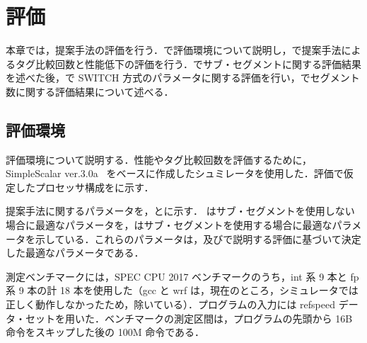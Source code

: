 
\chapter{評価}
\label{sec:eval}
本章では，提案手法の評価を行う．で評価環境について説明し，で提案手法によるタグ比較回数と性能低下の評価を行う．でサブ・セグメントに関する評価結果を述べた後，で SWITCH 方式のパラメータに関する評価を行い，でセグメント数に関する評価結果について述べる．

\section{評価環境}
\label{sec:eval_env}
評価環境について説明する．性能やタグ比較回数を評価するために，SimpleScalar ver.3.0a~\cite{SimpleScalar} をベースに作成したシュミレータを使用した．評価で仮定したプロセッサ構成をに示す．

提案手法に関するパラメータを，とに示す． はサブ・セグメントを使用しない場合に最適なパラメータを，はサブ・セグメントを使用する場合に最適なパラメータを示している．これらのパラメータは，及びで説明する評価に基づいて決定した最適なパラメータである．

測定ベンチマークには，SPEC CPU 2017 ベンチマークのうち，int 系 9 本と fp 系 9 本の計 18 本を使用した（gcc と wrf は，現在のところ，シミュレータでは正しく動作しなかったため，除いている）．プログラムの入力には refspeed データ・セットを用いた．ベンチマークの測定区間は，プログラムの先頭から 16B 命令をスキップした後の 100M 命令である．

